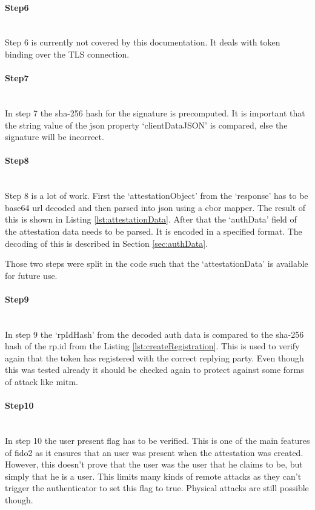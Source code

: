 \documentclass[a4paper, 11pt]{scrartcl}
\begin{document}
\paragraph{Step6}\hfill \\ 
Step 6 is currently not covered by this documentation. It deals with token binding over the TLS connection.

\paragraph{Step7}\hfill \\ 
In step 7 the \gls{sha-256} hash for the signature is precomputed. It is important that the string value of the json property `clientDataJSON' is compared, else the signature will be incorrect.

\paragraph{Step8}\hfill \\ 
Step 8 is a lot of work. First the `attestationObject' from the `response' has to be base64 url decoded and then parsed into \gls{json} using a \gls{cbor} mapper. The result of this is shown in Listing \ref{lst:attestationData}. After that the `authData' field of the attestation data needs to be parsed. It is encoded in a specified format. The decoding of this is described in Section \ref{sec:authData}. \cite{webauthn:authData}

Those two steps were split in the code such that the `attestationData' is available for future use.



\paragraph{Step9}\hfill \\ 
In step 9 the `rpIdHash' from the decoded auth data is compared to the \gls{sha-256} hash of the rp.id from the Listing \ref{lst:createRegistration}. This is used to verify again that the token has registered with the correct replying party. Even though this was tested already it should be checked again to protect against some forms of attack like \gls{mitm}. 

\paragraph{Step10}\hfill \\ 
In step 10 the user present flag has to be verified. This is one of the main features of \gls{fido2} as it ensures that an user was present when the attestation was created. However, this doesn't prove that the user was the user that he claims to be, but simply that he is a user. This limits many kinds of remote attacks as they can't trigger the authenticator to set this flag to true. Physical attacks are still possible though.
\end{document}

